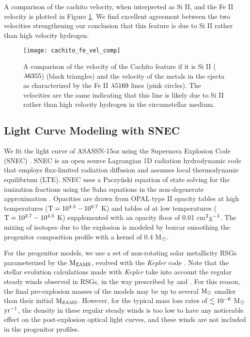 \documentclass[a4paper,fleqn,usenatbib]{mnras}
\newcommand{\msunperiod}{M$\rm{_{\odot}}$}
\begin{document}
A comparison of the cachito velocity, when interpreted as Si II, and the Fe II velocity is plotted in Figure \ref{fig:SiVelocity}.
We find excellent agreement between the two velocities strengthening our conclusion that this feature is due to Si II rather than high velocity hydrogen.
\begin{figure}
\begin{center}
\texttt{[image: cachito\_fe\_vel\_comp]}
\caption{A comparison of the velocity of the Cachito feature if it is Si II ($\rm{\lambda6355}$) (black triangles) and the velocity of the metals in the ejecta as characterized by the Fe II $\rm{\lambda5169}$ lines (pink circles).
The velocities are the same indicating that this line is likely due to Si II rather than high velocity hydrogen in the circumstellar medium.}
\label{fig:SiVelocity}
\end{center}
\end{figure}
\subsection{Light Curve Modeling with SNEC}\label{sec:LCmodeling}
We fit the light curve of ASASSN-15oz using the Supernova Explosion Code (SNEC) \citep{2015morozova}.
SNEC is an open source Lagrangian 1D radiation hydrodynamic code that employs flux-limited radiation diffusion and assumes local thermodynamic equilibrium (LTE).
SNEC uses a Paczy\'nski equation of state \citep{1983paczynski} solving for the ionization fractions using the Saha equations in the non-degenerate approximation \citep{2000zaghloul}. 
Opacities are drawn from OPAL type II opacity tables \citep{1996iglesias} at high temperatures ($\rm{T=10^{4.5}-10^{8.7}}$ K) and tables of \citet{2005ferguson} at low temperatures ($\rm{T = 10^{2.7}-10^{4.5}}$ K) supplemented with an opacity floor of 0.01 cm$\rm{^2}$g$\rm{^{-1}}$. 
The mixing of isotopes due to the explosion is modeled by boxcar smoothing the progenitor composition profile with a kernel of 0.4 \msunperiod.

For the progenitor models, we use a set of non-rotating solar metallicity RSGs parameterized by the $\rm{M_{ZAMS}}$, evolved with the {\it Kepler} code \citep{1978weaver,2007woosley,2015woosley, 2014sukhbold,2016sukhbold}.
Note that the stellar evolution calculations made with {\it Kepler} take into account the regular steady winds observed in RSGs, in the way prescribed by \citet{1990nieuwenhuijzen} and \citet{1999wellstein}.
For this reason, the final pre-explosion masses of the models may be up to several $\rm{M_{\odot}}$ smaller than their initial $\rm{M_{ZAMS}}$.
However, for the typical mass loss rates of $\rm{\lesssim10^{-6}}$ \msunperiod $\rm{yr^{-1}}$,  the density in these regular steady winds is too low to have any noticeable effect on the post-explosion optical light curves, and these winds are not included in the progenitor profiles. 
\end{document}
